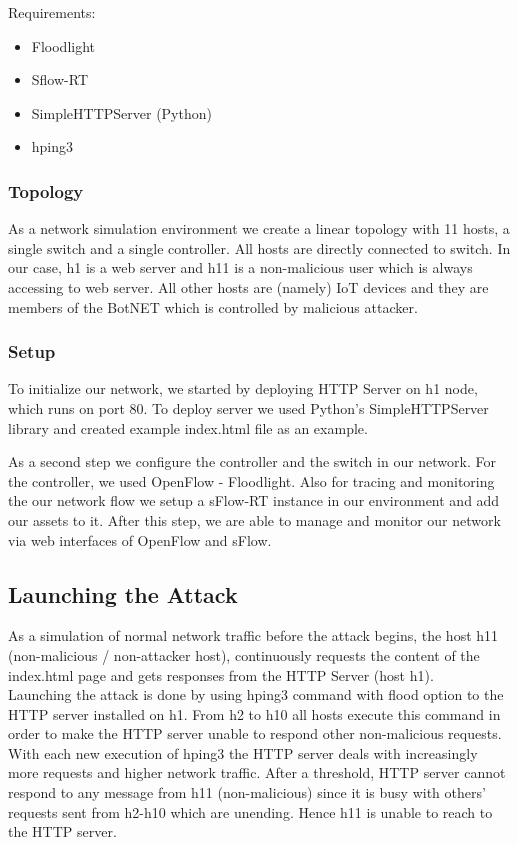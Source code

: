 \documentclass[conference,compsoc]{IEEEtran}
\begin{document}
Requirements:

\begin{itemize}
\item Floodlight
\item Sflow-RT
\item SimpleHTTPServer (Python)
\item hping3
\end{itemize}

\subsubsection{Topology}
As a network simulation environment we create a linear topology with 11 hosts, a single switch and a single controller. All hosts are directly connected to switch.  In our case, h1 is a web server and h11 is a non-malicious user which is always accessing to web server. All other hosts are (namely) IoT devices and they are members of the BotNET which is controlled by malicious attacker.


\subsubsection{Setup}
To initialize our network, we started by deploying HTTP Server on h1 node, which runs on port 80. To deploy server we used Python's SimpleHTTPServer library and created example index.html file as an example.

As a second step we configure the controller and the switch in our network. For the controller, we used OpenFlow - Floodlight. Also for tracing and monitoring the our network flow we setup a sFlow-RT instance in our environment and add our assets to it. After this step, we are able to manage and monitor our network via web interfaces of OpenFlow and sFlow. 



\subsection{Launching the Attack}


As a simulation of normal network traffic before the attack begins, the host h11 (non-malicious / non-attacker host), continuously requests the content of the index.html page and gets responses from the HTTP Server (host h1). \\

Launching the attack is done by using hping3 command with flood option to the HTTP server installed on h1. From h2 to h10 all hosts execute this command in order to make the HTTP server unable to respond other non-malicious requests. With each new execution of hping3 the HTTP server deals with increasingly more requests and higher network traffic. After a threshold, HTTP server cannot respond to any message from h11 (non-malicious) since it is busy with others' requests sent from h2-h10 which are unending. Hence h11 is unable to reach to the HTTP server. 
\end{document}
